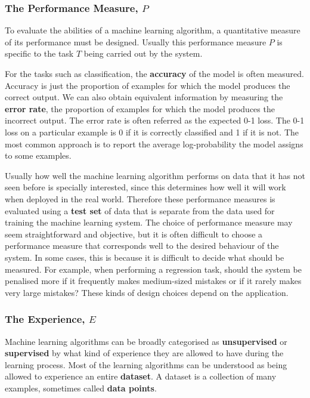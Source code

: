 \subsubsection{The Performance Measure, $P$}
To evaluate the abilities of a machine learning algorithm, a quantitative
measure of its performance must be designed. Usually this performance measure
$P$ is specific to the task $T$ being carried out by the system.


For the tasks such as classification, the \textbf{accuracy} of the model is
often measured. Accuracy is just the proportion of examples for which the model
produces the correct output. We can also obtain equivalent information by
measuring the \textbf{error rate}, the proportion of examples for which the
model produces the incorrect output. The error rate is often referred as the
expected 0-1 loss. The 0-1 loss on a particular example is 0 if it is correctly
classified and 1 if it is not. The most common approach is to report the
average log-probability the model assigns to some examples.


Usually how well the machine learning algorithm performs on data that it has
not seen before is specially interested, since this determines how well it
will work when deployed in the real world. Therefore these performance
measures is evaluated using a \textbf{test set} of data that is separate from
the data used for training the machine learning system.
The choice of performance measure may seem straightforward and objective, but
it is often difficult to choose a performance measure that corresponds well to
the desired behaviour of the system.
In some cases, this is because it is difficult to decide what should be
measured. For example, when performing a regression task, should the system be
penalised more if it frequently makes medium-sized mistakes or if it rarely
makes very large mistakes? These kinds of design choices depend on the
application.

\subsubsection{The Experience, $E$}
Machine learning algorithms can be broadly categorised as \textbf{unsupervised}
or \textbf{supervised} by what kind of experience they are allowed to have
during the learning process. Most of the learning algorithms can be understood
as being allowed to experience an entire \textbf{dataset}. A dataset is a
collection of many examples, sometimes called \textbf{data points}.


